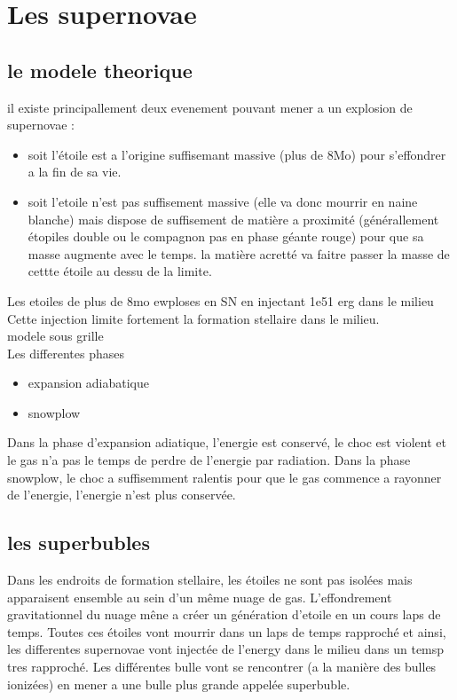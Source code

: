 \section{Les supernovae}



\subsection{le modele theorique}
il existe principallement deux evenement pouvant mener a un explosion de supernovae : 

\begin{itemize}
\item soit l'étoile est a l'origine suffisemant massive (plus de 8Mo) pour s'effondrer a la fin de sa vie.
\item soit l'etoile n'est pas suffisement massive (elle va donc mourrir en naine blanche) mais dispose de suffisement de matière a proximité (générallement étopiles double ou le compagnon pas en phase géante rouge) pour que sa masse augmente avec le temps.
la matière acretté va faitre passer la masse de cettte étoile au dessu de la limite.
\end{itemize}






Les etoiles de plus de 8mo ewploses en SN en injectant 1e51 erg dans le milieu\\
Cette injection limite fortement la formation stellaire dans le milieu.\\
modele sous grille\\



Les differentes phases
\begin{itemize}
\item expansion adiabatique
\item snowplow
\end{itemize}

Dans la phase d'expansion adiatique, l'energie est conservé, le choc est violent et le gas n'a pas le temps de perdre de l'energie par radiation.
Dans la phase snowplow, le choc a suffisemment ralentis pour que le gas commence a rayonner de l'energie, l'energie n'est plus conservée.


\subsection{les superbubles}
Dans les endroits de formation stellaire, les étoiles ne sont pas isolées mais apparaisent ensemble au sein d'un même nuage de gas.
L'effondrement gravitationnel du nuage mêne a créer un génération d'etoile en un cours laps de temps.
Toutes ces étoiles vont mourrir dans un laps de temps rapproché et ainsi, les differentes supernovae vont injectée de l'energy dans le milieu dans un temsp tres rapproché.
Les différentes bulle vont se rencontrer (a la manière des bulles ionizées) en mener a une bulle plus grande appelée superbuble.


